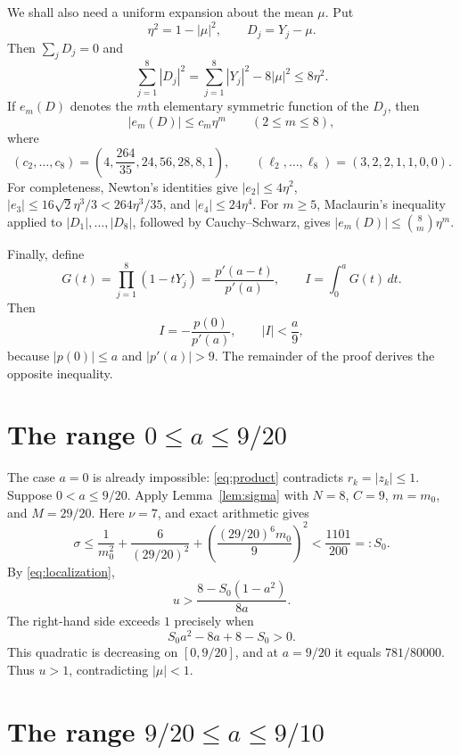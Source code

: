 \documentclass[11pt]{article}
\theoremstyle{remark}
\begin{document}
We shall also need a uniform expansion about the mean $\mu$.  Put
\[
 \eta^2=1-|\mu|^2,
 \qquad
 D_j=Y_j-\mu.
\]
Then $\sum_jD_j=0$ and
\[
 \sum_{j=1}^{8}|D_j|^2
 =\sum_{j=1}^{8}|Y_j|^2-8|\mu|^2\le8\eta^2.
\]
If $e_m(D)$ denotes the $m$th elementary symmetric function of the $D_j$, then
\begin{equation}\label{eq:em-bounds}
 |e_m(D)|\le c_m\eta^m\qquad(2\le m\le8),
\end{equation}
where
\begin{equation}\label{eq:constants}
 (c_2,\ldots,c_8)=
 \left(4,\frac{264}{35},24,56,28,8,1\right),
 \qquad
 (\ell_2,\ldots,\ell_8)=(3,2,2,1,1,0,0).
\end{equation}
For completeness, Newton's identities give
$|e_2|\le4\eta^2$, $|e_3|\le16\sqrt2\eta^3/3<264\eta^3/35$, and
$|e_4|\le24\eta^4$.  For $m\ge5$, Maclaurin's inequality applied to
$|D_1|,\ldots,|D_8|$, followed by Cauchy--Schwarz, gives
$|e_m(D)|\le\binom8m\eta^m$.

Finally, define
\begin{equation}\label{eq:I}
 G(t)=\prod_{j=1}^{8}(1-tY_j)=\frac{p'(a-t)}{p'(a)},
 \qquad
 I=\int_0^aG(t)\,dt.
\end{equation}
Then
\begin{equation}\label{eq:I-upper}
 I=-\frac{p(0)}{p'(a)},
 \qquad
 |I|<\frac a9,
\end{equation}
because $|p(0)|\le a$ and $|p'(a)|>9$.  The remainder of the proof derives
the opposite inequality.

\section{The range \texorpdfstring{$0\le a\le9/20$}{0 <= a <= 9/20}}

The case $a=0$ is already impossible: \eqref{eq:product} contradicts
$r_k=|z_k|\le1$.  Suppose $0<a\le9/20$.  Apply
Lemma~\ref{lem:sigma} with $N=8$, $C=9$, $m=m_0$, and $M=29/20$.  Here
$\nu=7$, and exact arithmetic gives
\begin{equation}\label{eq:small-sigma}
 \sigma\le
 \frac1{m_0^2}+\frac6{(29/20)^2}
 +\left(\frac{(29/20)^6m_0}{9}\right)^2
 <\frac{1101}{200}=:S_0.
\end{equation}
By \eqref{eq:localization},
\[
 u>\frac{8-S_0(1-a^2)}{8a}.
\]
The right-hand side exceeds $1$ precisely when
\[
 S_0a^2-8a+8-S_0>0.
\]
This quadratic is decreasing on $[0,9/20]$, and at $a=9/20$ it equals
$781/80000$.  Thus $u>1$, contradicting $|\mu|<1$.

\section{The range \texorpdfstring{$9/20\le a\le9/10$}{9/20 <= a <= 9/10}}
\end{document}
